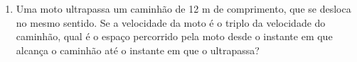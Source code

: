 \documentclass[a4paper,14pt]{article}
\begin{document}
\begin{multicols}{2}
\begin{enumerate}
    		\item Uma moto ultrapassa um caminhão de 12 m de comprimento, que se desloca no mesmo sentido. Se a velocidade da moto é o triplo da velocidade do caminhão, qual é o espaço percorrido pela moto desde o instante em que alcança o caminhão até o instante em que o ultrapassa?
    	\end{enumerate}
    $~$ \\ $~$ \\ $~$ \\ $~$ \\ $~$ \\ $~$ \\ $~$ \\ $~$ \\ $~$ \\ $~$ \\ $~$ \\ $~$ \\ $~$ \\ $~$ \\ $~$ \\ $~$ \\ $~$ \\ $~$ \\ $~$ \\ $~$ \\ $~$ \\ $~$ \\ $~$ \\ $~$ \\ $~$ \\ $~$ \\ $~$ \\ $~$ \\ $~$ \\ $~$ \\ $~$ \\ 
    \end{multicols}
\end{document}
